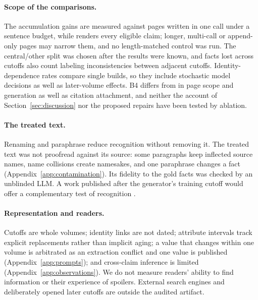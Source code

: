 \paragraph{Scope of the comparisons.}
The accumulation gains are measured against pages written in one call under a sentence
budget, while \sys renders every eligible claim; longer, multi-call or append-only pages may
narrow them, and no length-matched control was run. The central/other split was chosen
after the results were known, and facts lost across cutoffs also count labeling
inconsistencies between adjacent cutoffs. Identity-dependence rates compare single builds,
so they include stochastic model decisions as well as later-volume effects. B4 differs
from \sys in page scope and generation as well as citation attachment, and neither the
account of Section~\ref{sec:discussion} nor the proposed repairs have been tested by
ablation.

\paragraph{The treated text.}
Renaming and paraphrase reduce recognition without removing it. The treated text was not
proofread against its source: some paragraphs keep inflected source names, name collisions
create namesakes, and one paraphrase changes a fact (Appendix~\ref{app:contamination}).
Its fidelity to the gold facts was checked by an unblinded LLM. A work published after the
generator's training cutoff would offer a complementary test of recognition
\citep{karpinska2024nocha}.

\paragraph{Representation and readers.}
Cutoffs are whole volumes; identity links are not dated; attribute intervals track
explicit replacements rather than implicit aging; a value that changes within one volume
is arbitrated as an extraction conflict and one value is published
(Appendix~\ref{app:prompts}); and cross-claim inference is limited
(Appendix~\ref{app:observations}). We do not measure readers' ability to find information
or their experience of spoilers. External search engines and deliberately opened later
cutoffs are outside the audited artifact.
